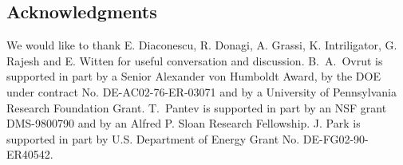 \documentclass[a4paper,12pt]{article}
\numberwithin{equation}{section}
\theoremstyle{plain}
\begin{document}
 



\subsection*{Acknowledgments}

We would like to thank E. Diaconescu, R. Donagi, A. Grassi, K. Intriligator, 
G. Rajesh and E. Witten for useful conversation and discussion. 
B.~A.~Ovrut is supported in part by a Senior Alexander von Humboldt
Award, by the DOE under contract No. DE-AC02-76-ER-03071 and by a
University of Pennsylvania Research Foundation Grant.
T.~Pantev is supported in part by an NSF grant DMS-9800790 and by an
Alfred P. Sloan Research Fellowship.
J. Park is supported in part by U.S. Department of Energy Grant
No. DE-FG02-90-ER40542. 
\end{document}
